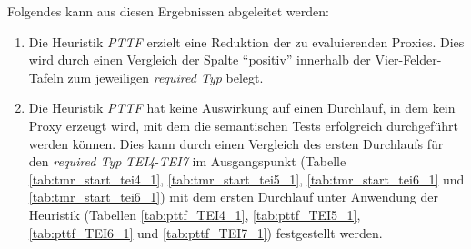 \begin{multicols}{2}
\end{multicols}
\pagebreak
\begin{multicols}{2}
\end{multicols}
\noindent
Folgendes kann aus diesen Ergebnissen abgeleitet werden:
\begin{enumerate}
\item Die Heuristik \emph{PTTF} erzielt eine Reduktion der zu evaluierenden Proxies. Dies wird durch einen Vergleich der Spalte ``positiv'' innerhalb der Vier-Felder-Tafeln zum jeweiligen \emph{required Typ} belegt.

\item Die Heuristik \emph{PTTF} hat keine Auswirkung auf einen Durchlauf, in dem kein Proxy erzeugt wird, mit dem die semantischen Tests erfolgreich durchgeführt werden können. Dies kann durch einen Vergleich des ersten Durchlaufs für den \emph{required Typ} \emph{TEI4}-\emph{TEI7} im Ausgangspunkt (Tabelle \ref{tab:tmr_start_tei4_1}, \ref{tab:tmr_start_tei5_1}, \ref{tab:tmr_start_tei6_1} und \ref{tab:tmr_start_tei6_1}) mit dem ersten Durchlauf unter Anwendung der Heuristik (Tabellen \ref{tab:pttf_TEI4_1}, \ref{tab:pttf_TEI5_1}, \ref{tab:pttf_TEI6_1} und \ref{tab:pttf_TEI7_1}) festgestellt werden.
\end{enumerate}